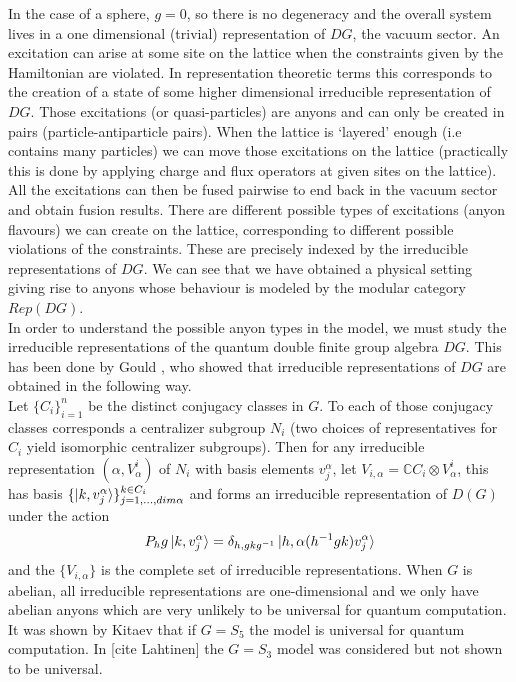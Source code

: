 \documentclass{article}
\begin{document}
In the case of a sphere, $g=0$, so there is no degeneracy and the overall system lives in a one dimensional (trivial) representation of $DG$, the vacuum sector. An excitation can arise at some site on the lattice when the constraints given by the Hamiltonian are violated. In representation theoretic terms this corresponds to the creation of a state of some higher dimensional irreducible representation of $DG$. Those excitations (or quasi-particles) are anyons and can only be created in pairs (particle-antiparticle pairs). When the lattice is `layered' enough (i.e contains many particles) we can move those excitations on the lattice (practically this is done by applying charge and flux operators at given sites on the lattice). All the excitations can then be fused pairwise to end back in the vacuum sector and obtain fusion results. There are different possible types of excitations (anyon flavours) we can create on the lattice, corresponding to different possible violations of the constraints. These are precisely indexed by the irreducible representations of $DG$. We can see that we have obtained a physical setting giving rise to anyons whose behaviour is modeled by the modular category $Rep(DG)$.\\
In order to understand the possible anyon types in the model, we must study the irreducible representations of the quantum double finite group algebra $DG$. This has been done by Gould \cite{Gould93}, who showed that irreducible representations of $DG$ are obtained in the following way.\\
Let $\{C_i\}_{i=1}^n$ be the distinct conjugacy classes in $G$. To each of those conjugacy classes corresponds a centralizer subgroup $N_i$ (two choices of representatives for $C_i$ yield isomorphic centralizer subgroups). Then for any irreducible representation $(\alpha,V^i_\alpha)$ of $N_i$ with basis elements $v^\alpha_j$, let $V_{i,\alpha} = \mathbb{C}C_i \otimes V^i_\alpha$, this has basis $\{ \ket{k,v^\alpha_j} \}_{j=1,...,dim\alpha}^{k\in C_i}$ and forms an irreducible representation of $D(G)$ under the action 
\begin{equation}
P_hg\ket{k,v^\alpha_j} = \delta_{h,gkg^{-1}} \ket{h,\alpha(h^{-1}gk)v^\alpha_j}
\end{equation}
and the $\{V_{i,\alpha}\}$ is the complete set of irreducible representations. When $G$ is abelian, all irreducible representations are one-dimensional and we only have abelian anyons which are very unlikely to be universal for quantum computation. It was shown by Kitaev that if $G=S_5$ the model is universal for quantum computation. In [cite Lahtinen] the $G=S_3$ model was considered but not shown to be universal.
\end{document}
